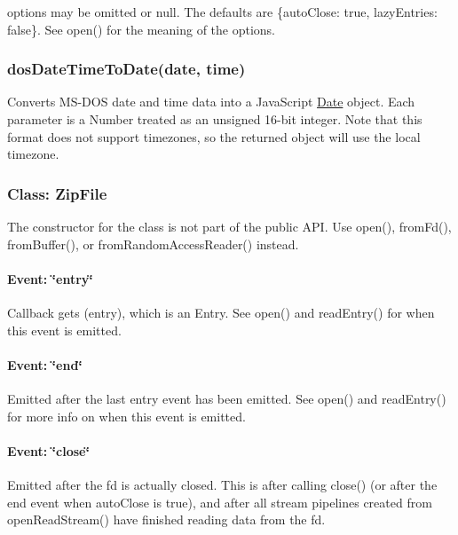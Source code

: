 {\ttfamily options} may be omitted or {\ttfamily null}. The defaults are {\ttfamily \{auto\+Close\+: true, lazy\+Entries\+: false\}}. See {\ttfamily open()} for the meaning of the options.

\subsubsection*{dos\+Date\+Time\+To\+Date(date, time)}

Converts M\+S-\/\+D\+OS {\ttfamily date} and {\ttfamily time} data into a Java\+Script {\ttfamily \mbox{\hyperlink{classDate}{Date}}} object. Each parameter is a {\ttfamily Number} treated as an unsigned 16-\/bit integer. Note that this format does not support timezones, so the returned object will use the local timezone.

\subsubsection*{Class\+: Zip\+File}

The constructor for the class is not part of the public A\+PI. Use {\ttfamily open()}, {\ttfamily from\+Fd()}, {\ttfamily from\+Buffer()}, or {\ttfamily from\+Random\+Access\+Reader()} instead.

\paragraph*{Event\+: \char`\"{}entry\char`\"{}}

Callback gets {\ttfamily (entry)}, which is an {\ttfamily Entry}. See {\ttfamily open()} and {\ttfamily read\+Entry()} for when this event is emitted.

\paragraph*{Event\+: \char`\"{}end\char`\"{}}

Emitted after the last {\ttfamily entry} event has been emitted. See {\ttfamily open()} and {\ttfamily read\+Entry()} for more info on when this event is emitted.

\paragraph*{Event\+: \char`\"{}close\char`\"{}}

Emitted after the fd is actually closed. This is after calling {\ttfamily close()} (or after the {\ttfamily end} event when {\ttfamily auto\+Close} is {\ttfamily true}), and after all stream pipelines created from {\ttfamily open\+Read\+Stream()} have finished reading data from the fd.

